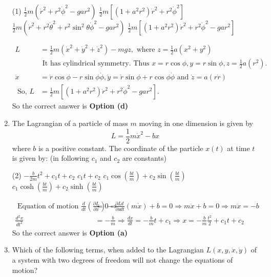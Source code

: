 \begin{enumerate}
	 \begin{tasks}(1)
		\task[\textbf{a.}]$\frac{1}{2} m\left(\dot{r}^{2}+r^{2} \dot{\phi}^{2}-g a r^{2}\right)$
		\task[\textbf{b.}]$\frac{1}{2} m\left[\left(1+a^{2} r^{2}\right) \dot{r}^{2}+r^{2} \dot{\phi}^{2}\right]$
		\task[\textbf{c.}]$\frac{1}{2} m\left(\dot{r}^{2}+r^{2} \dot{\theta}^{2}+r^{2} \sin ^{2} \theta \dot{\phi}^{2}-g a r^{2}\right)$
		\task[\textbf{d.}] $\frac{1}{2} m\left[\left(1+a^{2} r^{2}\right) \dot{r}^{2}+r^{2} \dot{\phi}^{2}-g a r^{2}\right]$
	\end{tasks}
\begin{answer}
	$$
	\begin{aligned}
	L&=\frac{1}{2} m\left(\dot{x}^{2}+\dot{y}^{2}+\dot{z}^{2}\right)-m g z, \text { where } z=\frac{1}{2} a\left(x^{2}+y^{2}\right)\\
	&\text { It has cylindrical symmetry. Thus } x=r \cos \phi, y=r \sin \phi, z=\frac{1}{2} a\left(r^{2}\right) \text {. }\\
	\dot{x}&=\dot{r} \cos \phi-r \sin \phi \dot{\phi}, \dot{y}=\dot{r} \sin \phi+r \cos \phi \dot{\phi} \text { and } \dot{z}=a(r \dot{r})\\
	\text { So, } L&=\frac{1}{2} m\left[\left(1+a^{2} r^{2}\right) \dot{r}^{2}+r^{2} \dot{\phi}^{2}-g a r^{2}\right] \text {. }
\end{aligned}
$$
So the correct answer is \textbf{Option (d)}
\end{answer}
	\item The Lagrangian of a particle of mass $m$ moving in one dimension is given by
	$$
	L=\frac{1}{2} m \dot{x}^{2}-b x
	$$
	where $b$ is a positive constant. The coordinate of the particle $x(t)$ at time $t$ is given by: (in following $c_{1}$ and $c_{2}$ are constants)

	 \begin{tasks}(2)
		\task[\textbf{a.}] $-\frac{b}{2 m} t^{2}+c_{1} t+c_{2}$
		\task[\textbf{b.}]$c_{1} t+c_{2}$
		\task[\textbf{c.}]$c_{1} \cos \left(\frac{b t}{m}\right)+c_{2} \sin \left(\frac{b t}{m}\right)$
		\task[\textbf{d.}] $c_{1} \cosh \left(\frac{b t}{m}\right)+c_{2} \sinh \left(\frac{b t}{m}\right)$
	\end{tasks}
\begin{answer}
	$$
	\begin{aligned}
	\text { Equation of motion } \frac{d}{d t}\left(\frac{\partial L}{\partial \dot{x}}\right)-\frac{\partial L}{\partial x}&=0 \Rightarrow \frac{d}{d t}(m \dot{x})+b=0 \Rightarrow m \ddot{x}+b=0 \Rightarrow m \ddot{x}=-b\\
	\frac{d^{2} x}{d t^{2}}&=-\frac{b}{m} \Rightarrow \frac{d x}{d t}=-\frac{b}{m} t+c_{1} \Rightarrow x=-\frac{b}{m} \frac{t^{2}}{2}+c_{1} t+c_{2}
\end{aligned}
$$
So the correct answer is \textbf{Option (a)}
\end{answer}
	\item Which of the following terms, when added to the Lagrangian $L(x, y, \dot{x}, \dot{y})$ of a system with two degrees of freedom will not change the equations of motion?


\end{enumerate}
